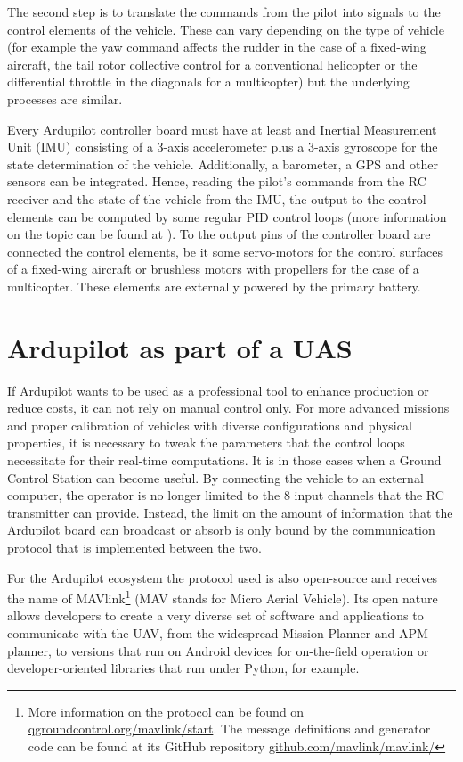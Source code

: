 The second step is to translate the commands from the pilot into signals to the control elements of the vehicle.
These can vary depending on the type of vehicle (for example the yaw command affects the rudder in the case of a fixed-wing aircraft, the tail rotor collective control for a conventional helicopter or the differential throttle in the diagonals for a multicopter) but the underlying processes are similar.

Every Ardupilot controller board must have at least and Inertial Measurement Unit (IMU) consisting of a 3-axis accelerometer plus a 3-axis gyroscope for the state determination of the vehicle.
Additionally, a barometer, a GPS and other sensors can be integrated.
Hence, reading the pilot's commands from the RC receiver and the state of the vehicle from the IMU, the output to the control elements can be computed by some regular PID control loops (more information on the topic can be found at \cite{ogata2010}).
To the output pins of the controller board are connected the control elements, be it some servo-motors for the control surfaces of a fixed-wing aircraft or brushless motors with propellers for the case of a multicopter.
These elements are externally powered by the primary battery.

\section{Ardupilot as part of a UAS}

If Ardupilot wants to be used as a professional tool to enhance production or reduce costs, it can not rely on manual control only. 
For more advanced missions and proper calibration of vehicles with diverse configurations and physical properties, it is necessary to tweak the parameters that the control loops necessitate for their real-time computations.
It is in those cases when a Ground Control Station can become useful.
By connecting the vehicle to an external computer, the operator is no longer limited to the 8 input channels that the RC transmitter can provide.
Instead, the limit on the amount of information that the Ardupilot board can broadcast or absorb is only bound by the communication protocol that is implemented between the two.

For the Ardupilot ecosystem the protocol used is also open-source and receives the name of MAVlink\footnote{More information on the protocol can be found on \url{qgroundcontrol.org/mavlink/start}. The message definitions and generator code can be found at its GitHub repository \url{github.com/mavlink/mavlink/}} (MAV stands for Micro Aerial Vehicle).
Its open nature allows developers to create a very diverse set of software and applications to communicate with the UAV, from the widespread Mission Planner and APM planner, to versions that run on Android devices for on-the-field operation or developer-oriented libraries that run under Python, for example.


